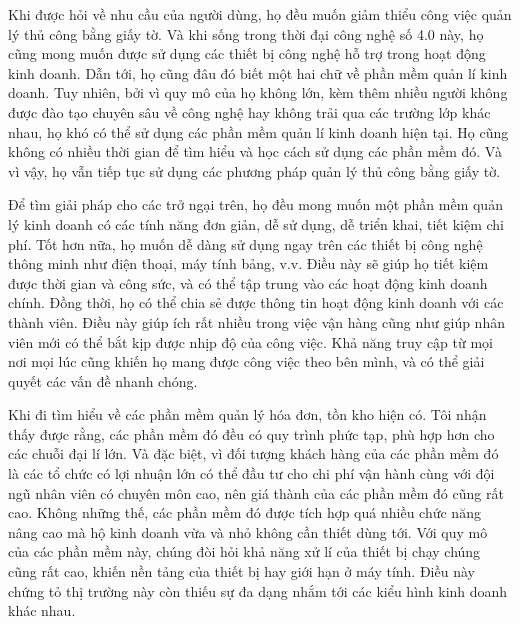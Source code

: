 \documentclass[../DoAn.tex]{subfiles}
\begin{document}

Khi được hỏi về nhu cầu của người dùng, họ đều muốn giảm thiểu công việc quản lý thủ công bằng giấy tờ. Và khi sống trong thời đại công nghệ số 4.0 này, họ cũng mong muốn được sử dụng các thiết bị công nghệ hỗ trợ trong hoạt động kinh doanh. Dẫn tới, họ cũng đâu đó biết một hai chữ về phần mềm quản lí kinh doanh. Tuy nhiên, bởi vì quy mô của họ không lớn, kèm thêm nhiều người không được đào tạo chuyên sâu về công nghệ hay không trải qua các trường lớp khác nhau, họ khó có thể sử dụng các phần mềm quản lí kinh doanh hiện tại. Họ cũng không có nhiều thời gian để tìm hiểu và học cách sử dụng các phần mềm đó. Và vì vậy, họ vẫn tiếp tục sử dụng các phương pháp quản lý thủ công bằng giấy tờ.

Để tìm giải pháp cho các trở ngại trên, họ đều mong muốn một phần mềm quản lý kinh doanh có các tính năng đơn giản, dễ sử dụng, dễ triển khai, tiết kiệm chi phí. Tốt hơn nữa, họ muốn dễ dàng sử dụng ngay trên các thiết bị công nghệ thông minh như điện thoại, máy tính bảng, v.v. Điều này sẽ giúp họ tiết kiệm được thời gian và công sức, và có thể tập trung vào các hoạt động kinh doanh chính. Đồng thời, họ có thể chia sẻ được thông tin hoạt động kinh doanh với các thành viên. Điều này giúp ích rất nhiều trong việc vận hàng cũng như giúp nhân viên mới có thể bắt kịp được nhịp độ của công việc. Khả năng truy cập từ mọi nơi mọi lúc cũng khiến họ mang được công việc theo bên mình, và có thể giải quyết các vấn đề nhanh chóng.

Khi đi tìm hiểu về các phần mềm quản lý hóa đơn, tồn kho hiện có. Tôi nhận thấy được rằng, các phần mềm đó đều có quy trình phức tạp, phù hợp hơn cho các chuỗi đại lí lớn. Và đặc biệt, vì đối tượng khách hàng của các phần mềm đó là các tổ chức có lợi nhuận lớn có thể đầu tư cho chi phí vận hành cùng với đội ngũ nhân viên có chuyên môn cao, nên giá thành của các phần mềm đó cũng rất cao. Không những thế, các phần mềm đó được tích hợp quá nhiều chức năng nâng cao mà hộ kinh doanh vừa và nhỏ không cần thiết dùng tới. Với quy mô của các phần mềm này, chúng đòi hỏi khả năng xử lí của thiết bị chạy chúng cũng rất cao, khiến nền tảng của thiết bị hay giới hạn ở máy tính. Điều này chứng tỏ thị trường này còn thiếu sự đa dạng nhắm tới các kiểu hình kinh doanh khác nhau.
\end{document}
